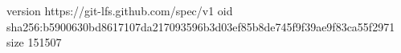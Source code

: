 version https://git-lfs.github.com/spec/v1
oid sha256:b5900630bd8617107da217093596b3d03ef85b8de745f9f39ae9f83ca55f2971
size 151507
